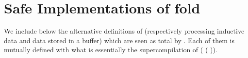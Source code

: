 \section{Safe Implementations of fold}
\label{appendix:safefold}

We include below the alternative definitions of 
(respectively processing inductive data and data stored in a buffer)
which are seen as total by \idris{}.
%
Each of them is mutually defined with what is essentially
the supercompilation of
(\IdrisKeyword{\textbackslash}  \IdrisKeyword{=>}   ( )).


